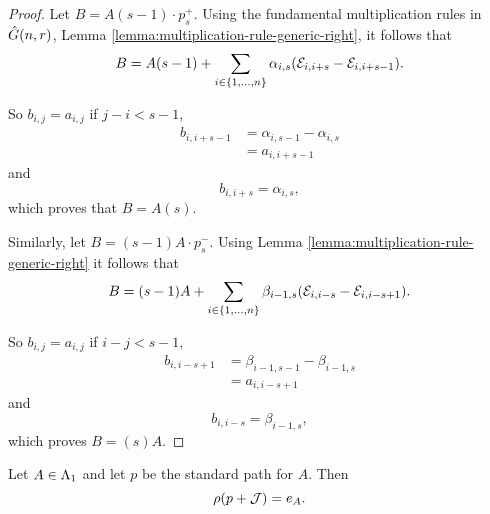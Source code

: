 \documentclass[a4paper, 11pt, twoside]{report}
\begin{document}
\begin{proof}
Let $B=A(s-1)\cdot p_s^+$. Using the fundamental multiplication rules in $\hat{G}(n,r)$, Lemma \ref{lemma:multiplication-rule-generic-right}, it follows that
\begin{equation*}
B = A(s-1) + \sum_{i\in\{1,\ldots,n\}} \alpha_{i,s}(\mathcal{E}_{i,i+s} -\mathcal{E}_{i,i+s-1}).
\end{equation*}

So $b_{i,j}=a_{i,j}$ if $j-i<s-1$,
\begin{align*}
b_{i,i+s-1}
&= \alpha_{i,s-1}-\alpha_{i,s}\\
&= a_{i,i+s-1}
\end{align*}
and
\begin{equation*}
b_{i,i+s} = \alpha_{i,s},
\end{equation*}
which proves that $B=A(s)$.

Similarly, let $B=(s-1)A\cdot p_s^-$. Using Lemma \ref{lemma:multiplication-rule-generic-right} it follows that
\begin{equation*}
B = (s-1)A + \sum_{i\in\{1,\ldots,n\}} \beta_{i-1,s}(\mathcal{E}_{i,i-s} - \mathcal{E}_{i,i-s+1}).
\end{equation*}

So $b_{i,j}=a_{i,j}$ if $i-j<s-1$,
\begin{align*}
b_{i,i-s+1}
&= \beta_{i-1,s-1} - \beta_{i-1,s}\\
&= a_{i,i-s+1}
\end{align*}
and
\begin{equation*}
b_{i,i-s} = \beta_{i-1,s},
\end{equation*}
which proves $B=(s)A$.
\end{proof}

\begin{lemma}\label{lemma:image-of-standard-path-generic}
Let $A\in\Lambda_1{}$ and let $p$ be the standard path for $A$. Then
\begin{equation*}
\rho(p+\mathcal{J}) = e_A.
\end{equation*}
\end{lemma}
\end{document}
